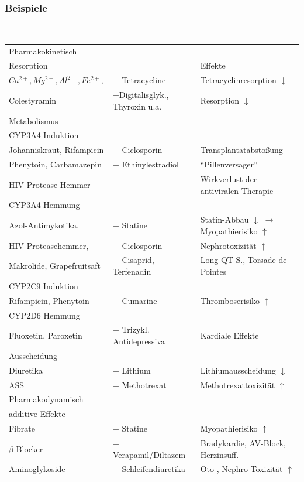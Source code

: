 \documentclass[10pt,a4paper]{report}
\begin{document}
\subsubsection{Beispiele}\mbox{} \\
\begin{tabularx}{\textwidth}{XXX}
Pharmakokinetisch&&\\
Resorption&&Effekte\\                                                                       
$Ca^{2+}, Mg^{2+}, Al^{2+}, Fe^{2+},$ &+ Tetracycline & Tetracyclinresorption $\downarrow$\\
Colestyramin&+Digitalisglyk., Thyroxin u.a.&Resorption $\downarrow$\\
Metabolismus&&\\
CYP3A4 Induktion&&\\
Johanniskraut, Rifampicin&+ Ciclosporin&Transplantatabstoßung\\
Phenytoin, Carbamazepin&+ Ethinylestradiol&“Pillenversager”\\
HIV-Protease Hemmer&&Wirkverlust der antiviralen Therapie\\
CYP3A4 Hemmung&&\\
Azol-Antimykotika,&+ Statine&Statin-Abbau $\downarrow$ $\rightarrow$ Myopathierisiko $\uparrow$\\
HIV-Proteasehemmer,& + Ciclosporin& Nephrotoxizität $\uparrow$\\
Makrolide, Grapefruitsaft& + Cisaprid, Terfenadin& Long-QT-S., Torsade de Pointes\\
CYP2C9 Induktion&&\\
Rifampicin, Phenytoin&+ Cumarine&Thromboserisiko $\uparrow$\\
CYP2D6 Hemmung&&\\
Fluoxetin, Paroxetin&+ Trizykl. Antidepressiva&Kardiale Effekte\\
Ausscheidung&&\\
Diuretika&+ Lithium&Lithiumausscheidung $\downarrow$\\
ASS&+ Methotrexat&Methotrexattoxizität $\uparrow$\\
Pharmakodynamisch&&\\
additive Effekte&&\\
Fibrate&+ Statine&Myopathierisiko $\uparrow$\\
$\beta$-Blocker&+ Verapamil/Diltazem&Bradykardie, AV-Block, Herzinsuff.\\
Aminoglykoside&+ Schleifendiuretika&Oto-, Nephro-Toxizität $\uparrow$\\

\end{tabularx}
\end{document}
